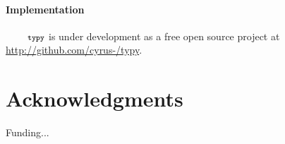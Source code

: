 \documentclass[10pt]{sigplanconf}
\newcommand{\typy}{\texttt{\footnotesize typy}}
\newcommand{\lip}[1]{\lstinline[language=Python,basicstyle=\ttfamily\footnotesize,morekeywords={with},deletendkeywords={tuple,buffer,map}]{#1}}
\begin{document}

\paragraph{Implementation}
$\typy$ is under development as a free open source project at 
\url{http://github.com/cyrus-/typy}.

\section*{Acknowledgments}
Funding...









\end{document}

